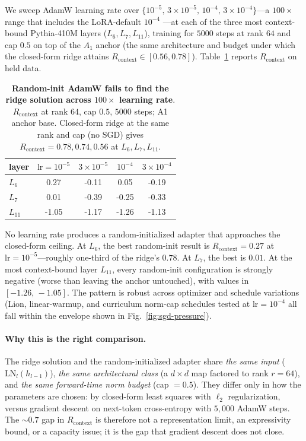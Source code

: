 We sweep AdamW learning rate over $\{10^{-5},\,3{\times}10^{-5},\,10^{-4},\,
3{\times}10^{-4}\}$---a $100\times$ range that includes the LoRA-default
$10^{-4}$ \citep{hu2022lora}---at each of the three most context-bound
Pythia-410M layers ($L_6, L_7, L_{11}$), training for $5000$ steps at rank
$64$ and cap $0.5$ on top of the $A_1$ anchor (the same architecture and
budget under which the closed-form ridge attains
$R_\mathrm{context} \in [0.56, 0.78]$).
Table~\ref{tab:lr-probe-random} reports $R_\mathrm{context}$ on held data.

\begin{table}[t]
\centering\small
\caption{\textbf{Random-init AdamW fails to find the ridge solution across
$100\times$ learning rate}. $R_\mathrm{context}$ at rank $64$, cap $0.5$,
$5000$ steps; A1 anchor base. Closed-form ridge at the same rank and cap
(no SGD) gives $R_\mathrm{context} = 0.78, 0.74, 0.56$ at $L_6, L_7, L_{11}$.}
\label{tab:lr-probe-random}
\begin{tabular}{lcccc}
\toprule
layer & $\mathrm{lr}{=}10^{-5}$ & $3{\times}10^{-5}$ & $10^{-4}$ & $3{\times}10^{-4}$ \\
\midrule
$L_6$  &  0.27 & -0.11 &  0.05 & -0.19 \\
$L_7$  &  0.01 & -0.39 & -0.25 & -0.33 \\
$L_{11}$ & -1.05 & -1.17 & -1.26 & -1.13 \\
\bottomrule
\end{tabular}
\end{table}

No learning rate produces a random-initialized adapter that approaches the
closed-form ceiling. At $L_6$, the best random-init result is
$R_\mathrm{context} = 0.27$ at $\mathrm{lr}{=}10^{-5}$---roughly one-third
of the ridge's $0.78$. At $L_7$, the best is $0.01$. At the most
context-bound layer $L_{11}$, every random-init configuration is strongly
negative (worse than leaving the anchor untouched), with values in
$[-1.26,\,-1.05]$. The pattern is robust across optimizer and schedule
variations (Lion, linear-warmup, and curriculum norm-cap schedules tested
at $\mathrm{lr}{=}10^{-4}$ all fall within the envelope shown in
Fig.~\ref{fig:sgd-pressure}).

\paragraph{Why this is the right comparison.} The ridge solution and the
random-initialized adapter share \emph{the same input}
($\mathrm{LN}_l(h_{l-1})$), \emph{the same architectural class} (a
$d{\times}d$ map factored to rank $r{=}64$), and \emph{the same forward-time
norm budget} (cap $= 0.5$). They differ only in how the parameters are
chosen: by closed-form least squares with $\ell_2$ regularization, versus
gradient descent on next-token cross-entropy with $5{,}000$ AdamW steps. The
$\sim 0.7$ gap in $R_\mathrm{context}$ is therefore not a representation
limit, an expressivity bound, or a capacity issue; it is the gap that
gradient descent does not close.

